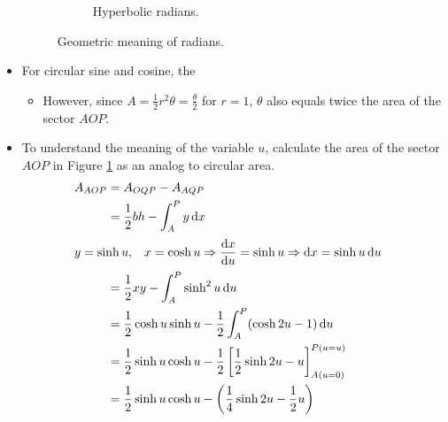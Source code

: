 \documentclass[../main.tex]{subfiles}
\begin{document}
\begin{itemize}
\begin{figure}[h!]
\begin{subfigure}[b]{0.48\linewidth}
            \caption{Hyperbolic radians.}
            \label{fig:hyperbolicGeometricb}
        \end{subfigure}
        \caption{Geometric meaning of radians.}
        \label{fig:hyperbolicGeometric}
    \end{figure}
    \item For circular sine and cosine, the 
    \begin{itemize}
        \item However, since $A=\frac{1}{2}r^2\theta=\frac{\theta}{2}$ for $r=1$, $\theta$ also equals twice the area of the sector $AOP$.
    \end{itemize}
    \item To understand the meaning of the variable $u$, calculate the area of the sector $AOP$ in Figure \ref{fig:hyperbolicGeometricb} as an analog to circular area.
    \begin{align*}
        A_{AOP} &= A_{OQP}-A_{AQP}\\
        &= \frac{1}{2}bh - \int_A^P y\dd{x}\\
        \intertext{\centering$
            \begin{aligned}
                y &= \sinh u,&
                x = \cosh u \Rightarrow \dv{x}{u} = \sinh u \Rightarrow \dd x &= \sinh u\dd{u}
            \end{aligned}
        $}
        &= \frac{1}{2}xy - \int_A^P \sinh^2u\dd{u}\\
        &= \frac{1}{2}\cosh u\sinh u - \frac{1}{2}\int_A^P (\cosh 2u-1)\dd{u}\\
        &= \frac{1}{2}\sinh u\cosh u - \frac{1}{2}\left[ \frac{1}{2}\sinh 2u-u \right]_{A(u=0)}^{P(u=u)}\\
        &= \frac{1}{2}\sinh u\cosh u - \left( \frac{1}{4}\sinh 2u-\frac{1}{2}u \right)\\

\end{align*}
\end{itemize}
\end{document}
